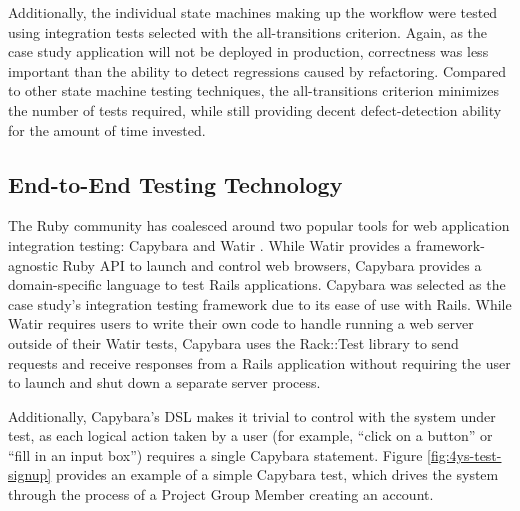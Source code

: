 \documentclass[document.tex]{subfiles}
\begin{document}
Additionally, the individual state machines making up the workflow were tested using integration tests selected with the all-transitions criterion. Again, as the case study application will not be deployed in production, correctness was less important than the ability to detect regressions caused by refactoring. Compared to other state machine testing techniques, the all-transitions criterion minimizes the number of tests required, while still providing decent defect-detection ability for the amount of time invested.


\subsection {End-to-End Testing Technology}

The Ruby community has coalesced around two popular tools for web application integration testing: Capybara \cite{capybara} and Watir \cite{watir}. While Watir provides a framework-agnostic Ruby API to launch and control web browsers, Capybara provides a domain-specific language to test Rails applications. Capybara was selected as the case study's integration testing framework due to its ease of use with Rails. While Watir requires users to write their own code to handle running a web server outside of their Watir tests, Capybara uses the Rack::Test library to send requests and receive responses from a Rails application without requiring the user to launch and shut down a separate server process.

Additionally, Capybara's DSL makes it trivial to control with the system under test, as each logical action taken by a user (for example, ``click on a button'' or ``fill in an input box'') requires a single Capybara statement. Figure \ref{fig:4ys-test-signup} provides an example of a simple Capybara test, which drives the system through the process of a Project Group Member creating an account.
\end{document}
